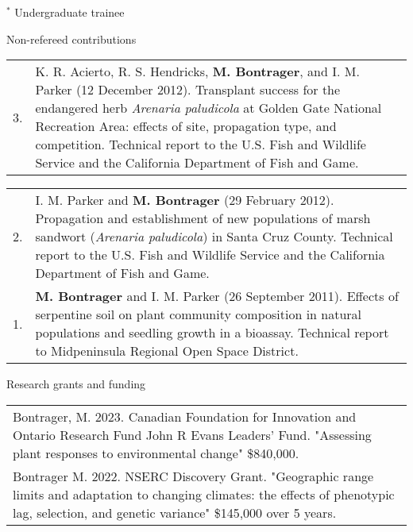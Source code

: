 \documentclass[letterpaper,11pt,oneside]{article}
\begin{document}
\smallskip
\noindent $^{*}$ Undergraduate trainee

\bigskip




\noindent\Large{Non-refereed contributions}  
\normalsize
\medskip

\def\arraystretch{1.4}
\noindent \begin{tabular}{@{} p{0.5cm} >{\raggedright\arraybackslash}p{16.7cm}}
3. & K. R. Acierto, R. S. Hendricks, \textbf{M. Bontrager}, and I. M. Parker (12 December 2012). Transplant success for the endangered herb \textit{Arenaria paludicola} at Golden Gate National Recreation Area: effects of site, propagation type, and competition. Technical report to the U.S. Fish and Wildlife Service and the California Department of Fish and Game. \\
\end{tabular}

\def\arraystretch{1.4}
\noindent \begin{tabular}{@{} p{0.5cm} >{\raggedright\arraybackslash}p{16.7cm}}
2. & I. M. Parker and \textbf{M. Bontrager} (29 February 2012). Propagation and establishment of new populations of marsh sandwort (\textit{Arenaria paludicola}) in Santa Cruz County. Technical report to the U.S. Fish and Wildlife Service and the California Department of Fish and Game. \\
1. & \textbf{M. Bontrager} and I. M. Parker (26 September 2011). Effects of serpentine soil on plant community composition in natural populations and seedling growth in a bioassay. Technical report to Midpeninsula Regional Open Space District. \\
\end{tabular}

\bigskip

\newpage



\noindent\Large{Research grants and funding}
\normalsize
\medskip


\noindent \begin{tabular}{@{} >{\raggedright\arraybackslash}p{17.2cm}}
Bontrager, M. 2023. Canadian Foundation for Innovation and Ontario Research Fund John R Evans Leaders' Fund. "Assessing plant responses to environmental change" \$840,000. \\

Bontrager M. 2022. NSERC Discovery Grant. "Geographic range limits and adaptation to changing climates: the effects of phenotypic lag, selection, and genetic variance" \$145,000 over 5 years. \\
\end{tabular}
\end{document}
